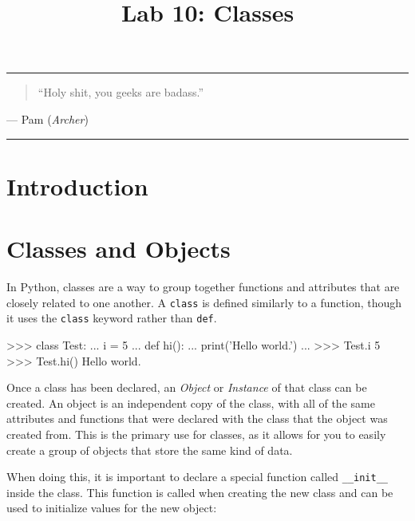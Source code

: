 \documentclass[11pt]{cselabheader}
\title{Lab 10: Classes}
\begin{document}
\maketitle

\hrule
\begin{quotation}
``Holy shit, you geeks are badass.''
\end{quotation}
\begin{flushright}
  --- Pam (\emph{Archer})
\end{flushright}

\hrule

\pagebreak
\section{Introduction}


\pagebreak

\section{Classes and Objects}
\label{sec:classes}
In Python, classes are a way to group together functions and attributes
that are closely related to one another. A \lstinline{class} is defined
similarly to a function, though it uses the \lstinline{class} keyword rather
than \lstinline{def}.

\begin{pyconcode}
>>> class Test:
...     i = 5
...     def hi():
...         print('Hello world.')
... 
>>> Test.i
5
>>> Test.hi()
Hello world.
\end{pyconcode}

Once a class has been declared, an \emph{Object} or
\emph{Instance} of that class can be created. An object is an independent
copy of the class, with all of the same attributes and functions that were
declared with the class that the object was created from. This is the
primary use for classes, as it allows for you to easily create a group of
objects that store the same kind of data.

When doing this, it is important to declare a special function called
\lstinline{__init__} inside the class. This function is called when
creating the new class and can be used to initialize values for the
new object:

\end{document}
